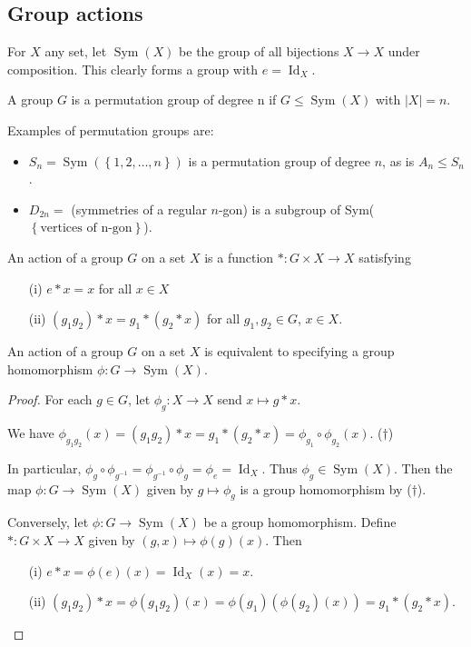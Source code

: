 \documentclass[egregdoesnotlikesansseriftitles,a4paper]{scrartcl}
\begin{document}
\subsection{Group actions}
\begin{definition*}
      For $X$ any set, let $\operatorname{Sym}(X)$ be the group of all bijections $X \rightarrow X$ under composition. This clearly forms a group with $e=\operatorname{Id}_X$.

      A group $G$ is a permutation group of degree n if $G \leq \operatorname{Sym}(X)$ with $|X|=n$. 
\end{definition*}
\begin{example*}
      Examples of permutation groups are:
      \begin{itemize}
           \item $S_{n}=\operatorname{Sym}(\left\{1,2,\ldots ,n\right\})$ is a permutation group of degree $n$, as is $A_{n}\leq S_{n}$.
           \item $D_{2n}=$ (symmetries of a regular $n$-gon) is a subgroup of Sym($\left\{\text{vertices of n-gon}\right\}$).
      \end{itemize}
\end{example*}
\begin{definition*}
      An action of a group $G$ on a set $X$ is a function $\ast: G \times X \rightarrow X$ satisfying 
      \begin{itemize}
           \item[(i)] $e \ast x =x $ for all $x \in X$ 
           \item[(ii)] $(g_1 g_2 )\ast x= g_1 \ast (g_2 \ast x)$ for all $g_1 ,g_2 \in G$, $x \in X$.
      \end{itemize}
\end{definition*}
\begin{proposition}
     An action of a group $G$ on a set $X$ is equivalent to specifying a group homomorphism $\phi: G \rightarrow \operatorname{Sym}(X)$.
\end{proposition}
\begin{proof}
      For each $g \in G$, let $\phi_{g}: X \rightarrow X$ send $x \mapsto g \ast x$. 

      We have $\phi_{g_1 g_2 }(x)=(g_1 g_2 )\ast x=g_1 \ast (g_2 \ast x)=\phi_{g_1 }\circ \phi_{g_2 }(x)$. ($\dagger$)

      In particular, $\phi_{g}\circ \phi_{{g}^{-1}}=\phi_{{g}^{-1}}\circ \phi_{g}=\phi_{e}=\operatorname{Id}_X$. Thus $\phi_{g} \in \operatorname{Sym}(X)$. Then the map $\phi: G \rightarrow \operatorname{Sym}(X)$ given by $g \mapsto \phi_{g}$ is a group homomorphism by ($\dagger$).

      Conversely, let $\phi: G \rightarrow \operatorname{Sym}(X)$ be a group homomorphism. Define $\ast: G \times X \rightarrow X$ given by $(g,x) \mapsto \phi (g)(x)$. Then
      \begin{itemize}
           \item[(i)] $e \ast x=\phi (e)(x)=\operatorname{Id}_X (x)=x$.
           \item[(ii)] $(g_1 g_2 )\ast x= \phi (g_1 g_2 )(x)=\phi (g_1 )(\phi (g_2)(x))=g_1 \ast (g_2 \ast x)$. 
      \end{itemize}
\end{proof}
\end{document}
